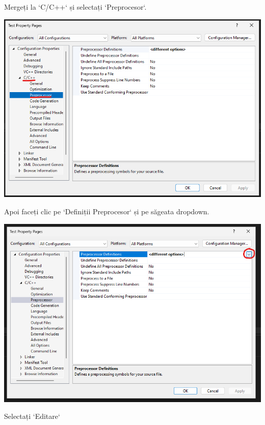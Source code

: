 \documentclass[../ro-fa-lab.tex]{subfiles}
\begin{document}
Mergeți la `C/C++` și selectați `Preprocesor`.

\includegraphics[width=\textwidth,alt={A screenshot of a computer Description automatically generated}]{./Resources/tutorial_lab9/image10.png}

Apoi faceți clic pe `Definiții Preprocesor` și pe săgeata dropdown.

\includegraphics[width=\textwidth,alt={A screenshot of a computer Description automatically generated}]{./Resources/tutorial_lab9/image11.png}

Selectați `Editare`
\end{document}
